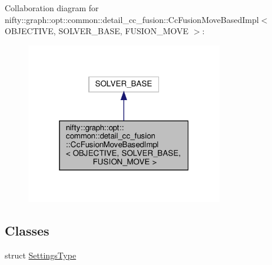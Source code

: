Collaboration diagram for nifty\+:\+:graph\+:\+:opt\+:\+:common\+:\+:detail\+\_\+cc\+\_\+fusion\+:\+:Cc\+Fusion\+Move\+Based\+Impl$<$ O\+B\+J\+E\+C\+T\+I\+VE, S\+O\+L\+V\+E\+R\+\_\+\+B\+A\+SE, F\+U\+S\+I\+O\+N\+\_\+\+M\+O\+VE $>$\+:
\nopagebreak
\begin{figure}[H]
\begin{center}
\leavevmode
\includegraphics[width=244pt]{classnifty_1_1graph_1_1opt_1_1common_1_1detail__cc__fusion_1_1CcFusionMoveBasedImpl__coll__graph}
\end{center}
\end{figure}
\subsection*{Classes}
\begin{DoxyCompactItemize}
\item 
struct \hyperlink{structnifty_1_1graph_1_1opt_1_1common_1_1detail__cc__fusion_1_1CcFusionMoveBasedImpl_1_1SettingsType}{Settings\+Type}
\end{DoxyCompactItemize}
